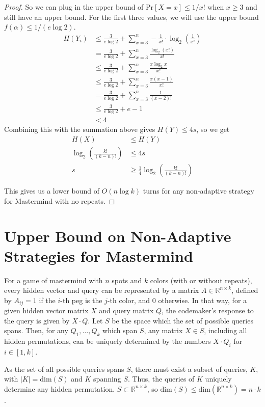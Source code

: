 \documentclass[12pt, a4paper]{article}
\begin{document}
\begin{proof}
So we can plug in the upper bound of $\text{Pr}[X=x]\le 1/x!$ when $x\ge 3$ and
still have an upper bound. For the first three values, we will use the upper bound
$f(\alpha)\le 1/(e\log 2)$. 
    \begin{align*}
    H(Y_i) &\leq \frac{3}{e\log 2}+\sum_{x=3}^n-\frac{1}{x!}\cdot\log_2(\frac{1}{x!})\\
    &= \frac{3}{e\log 2}+\sum_{x=3}^n \frac{\log_2(x!)}{x!}\\
    &\leq \frac{3}{e\log 2}+\sum_{x=3}^n \frac{x \log_2 x}{x!}\\
    &\leq \frac{3}{e\log 2}+\sum_{x=3}^n \frac{x (x-1)}{x!}\\
    &= \frac{3}{e\log 2}+\sum_{x=3}^n \frac{1}{(x-2)!}\\
    &\leq \frac{3}{e\log 2}+e-1\\
    & < 4
    \end{align*}
Combining this with the summation above gives $H(Y) \leq 4s$, so we get
	\begin{align*}
	H(X) &\leq H(Y)\\
	\log_2\left(\frac{k!}{(k-n)!}\right) &\leq 4s\\
	s &\geq \frac{1}{4}\log_2\left(\frac{k!}{(k-n)!}\right)
	\end{align*}

This gives us a lower bound of $O(n \log k)$ turns for any non-adaptive strategy for
Mastermind with no repeats.
\end{proof}

\clearpage

\section*{Upper Bound on Non-Adaptive Strategies for Mastermind}
For a game of mastermind with $n$ spots and $k$ colors (with or without repeats), every
hidden vector and query can be represented by a matrix $A\in\mathbb{R}^{n\times k}$,
defined by $A_{ij}=1$ if the $i$-th peg is the $j$-th color, and 0 otherwise.
In that way, for a given hidden vector matrix $X$ and query matrix $Q$,
the codemaker's response to the query is given by $X\cdot Q$.
Let $S$ be the space which the set of possible queries spans. Then, for any
$Q_1, \ldots, Q_k$ which span $S$, any matrix $X\in S$, including all hidden
permutations, can be uniquely determined by the numbers $X\cdot Q_i$ for $i\in [1,k]$.

As the set of all possible queries spans $S$, there must exist a subset of queries,
$K$, with $|K|=\text{dim}(S)$ and $K$ spanning $S$. Thus, the queries of $K$ uniquely
determine any hidden permutation. $S\subset \mathbb{R}^{n\times k}$,
so $\text{dim}(S)\le \text{dim}(\mathbb{R}^{n\times k})=n\cdot k$.
\end{document}
